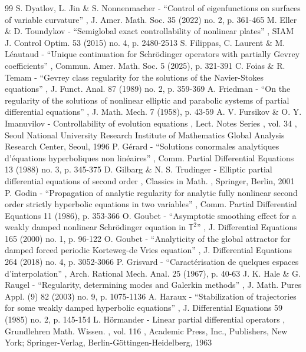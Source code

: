 \documentclass[11pt]{article}
\theoremstyle{definition}
\begin{document}
\begin{thebibliography}{99}
 S. Dyatlov, L. Jin \& S. Nonnenmacher - “Control of eigenfunctions on surfaces of variable curvature” , J. Amer. Math. Soc. 35 (2022) no. 2, p. 361-465
 M. Eller \& D. Toundykov - “Semiglobal exact controllability of nonlinear plates” , SIAM J. Control Optim. 53 (2015) no. 4, p. 2480-2513
 S. Filippas, C. Laurent \& M. Léautaud - “Unique continuation for Schrödinger operators with partially Gevrey coefficients” , Commun. Amer. Math. Soc. 5 (2025), p. 321-391
 C. Foias \& R. Temam - “Gevrey class regularity for the solutions of the Navier-Stokes equations” , J. Funct. Anal. 87 (1989) no. 2, p. 359-369
 A. Friedman - “On the regularity of the solutions of nonlinear elliptic and parabolic systems of partial differential equations” , J. Math. Mech. 7 (1958), p. 43-59
 A. V. Fursikov \& O. Y. Imanuvilov - Controllability of evolution equations , Lect. Notes Series , vol. 34 , Seoul National University Research Institute of Mathematics Global Analysis Research Center, Seoul, 1996
 P. Gérard - “Solutions conormales analytiques d’équations hyperboliques non linéaires” , Comm. Partial Differential Equations 13 (1988) no. 3, p. 345-375
 D. Gilbarg \& N. S. Trudinger - Elliptic partial differential equations of second order , Classics in Math. , Springer, Berlin, 2001
 P. Godin - “Propagation of analytic regularity for analytic fully nonlinear second order strictly hyperbolic equations in two variables” , Comm. Partial Differential Equations 11 (1986), p. 353-366
 O. Goubet - “Asymptotic smoothing effect for a weakly damped nonlinear Schrödinger equation in $\mathbb{T}^2$” , J. Differential Equations 165 (2000) no. 1, p. 96-122
 O. Goubet - “Analyticity of the global attractor for damped forced periodic Korteweg-de Vries equation” , J. Differential Equations 264 (2018) no. 4, p. 3052-3066
 P. Grisvard - “Caractérisation de quelques espaces d’interpolation” , Arch. Rational Mech. Anal. 25 (1967), p. 40-63
 J. K. Hale \& G. Raugel - “Regularity, determining modes and Galerkin methods” , J. Math. Pures Appl. (9) 82 (2003) no. 9, p. 1075-1136
 A. Haraux - “Stabilization of trajectories for some weakly damped hyperbolic equations” , J. Differential Equations 59 (1985) no. 2, p. 145-154
 L. Hörmander - Linear partial differential operators , Grundlehren Math. Wissen. , vol. 116 , Academic Press, Inc., Publishers, New York; Springer-Verlag, Berlin-Göttingen-Heidelberg, 1963

\end{thebibliography}
\end{document}
